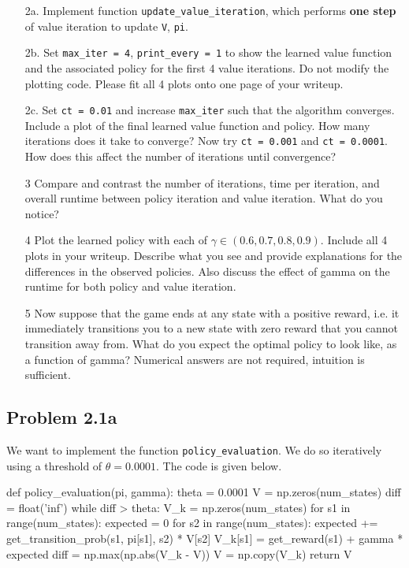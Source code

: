 \documentclass[submit]{harvardml}
\begin{document}
\begin{framed}
\begin{itemize}
    \item [2a.] Implement function
      \texttt{update\_value\_iteration}, which performs \textbf{one step} of value iteration to update \texttt{V}, \texttt{pi}.
      
    \item [2b.] Set \texttt{max\_iter = 4}, \texttt{print\_every = 1} to show the learned value function and the associated policy for the first 4 value iterations. Do not modify the plotting code. Please fit all 4 plots onto one page of your writeup.
    
    \item [2c.] Set \texttt{ct = 0.01} and increase \texttt{max\_iter} such that the algorithm converges. Include a plot of the final learned value function and policy. How many iterations does it take to converge? Now try \texttt{ct = 0.001} and \texttt{ct = 0.0001}. How does this affect the number of iterations until convergence?
    
    \item[3] Compare and contrast the number of iterations, time per iteration, and overall runtime between policy iteration and value iteration. What do you notice?
    
    \item[4] Plot the learned policy with each of $\gamma \in (0.6,0.7,0.8,0.9)$. Include all 4 plots in your writeup. Describe what you see and provide explanations for the differences in the observed policies. Also discuss the effect of gamma on the runtime for both policy and value iteration.
    
    \item[5] Now suppose that the game ends at any state with a positive reward, i.e. it immediately transitions you to a new state with zero reward that you cannot transition away from. What do you expect the optimal policy to look like, as a function of gamma? Numerical answers are not required, intuition is sufficient.
 
\end{itemize}
\end{framed}

\newpage
\subsection*{Problem 2.1a}

We want to implement the function \texttt{policy\_evaluation}. We do so iteratively using a threshold of $\theta = 0.0001$. The code is given below.
\begin{python}
def policy_evaluation(pi, gamma):
    theta = 0.0001
    V = np.zeros(num_states)
    diff = float('inf')
    while diff > theta:
        V_k = np.zeros(num_states)
        for s1 in range(num_states):
            expected = 0
            for s2 in range(num_states):
                expected += get_transition_prob(s1, pi[s1], s2) * V[s2]
            V_k[s1] = get_reward(s1) + gamma * expected
        diff = np.max(np.abs(V_k - V))
        V = np.copy(V_k)
    return V
\end{python}
\end{document}
